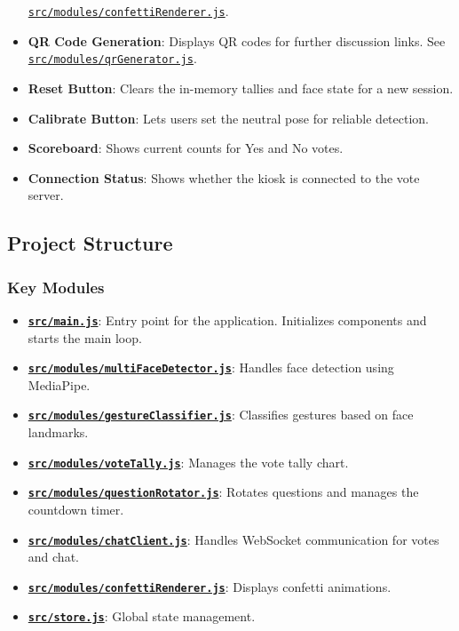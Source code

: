 \begin{itemize}
  \href{src/modules/confettiRenderer.js}{\texttt{src/modules/confettiRenderer.js}}.
\item
  \textbf{QR Code Generation}: Displays QR codes for further discussion
  links. See
  \href{src/modules/qrGenerator.js}{\texttt{src/modules/qrGenerator.js}}.
\item
  \textbf{Reset Button}: Clears the in-memory tallies and face state for
  a new session.
\item
  \textbf{Calibrate Button}: Lets users set the neutral pose for
  reliable detection.
\item
  \textbf{Scoreboard}: Shows current counts for Yes and No votes.
\item
  \textbf{Connection Status}: Shows whether the kiosk is connected to
  the vote server.
\end{itemize}

\subsection{Project Structure}\label{project-structure}

\subsubsection{Key Modules}\label{key-modules}

\begin{itemize}
\tightlist
\item
  \textbf{\href{src/main.js}{\texttt{src/main.js}}}: Entry point for the
  application. Initializes components and starts the main loop.
\item
  \textbf{\href{src/modules/multiFaceDetector.js}{\texttt{src/modules/multiFaceDetector.js}}}:
  Handles face detection using MediaPipe.
\item
  \textbf{\href{src/modules/gestureClassifier.js}{\texttt{src/modules/gestureClassifier.js}}}:
  Classifies gestures based on face landmarks.
\item
  \textbf{\href{src/modules/voteTally.js}{\texttt{src/modules/voteTally.js}}}:
  Manages the vote tally chart.
\item
  \textbf{\href{src/modules/questionRotator.js}{\texttt{src/modules/questionRotator.js}}}:
  Rotates questions and manages the countdown timer.
\item
  \textbf{\href{src/modules/chatClient.js}{\texttt{src/modules/chatClient.js}}}:
  Handles WebSocket communication for votes and chat.
\item
  \textbf{\href{src/modules/confettiRenderer.js}{\texttt{src/modules/confettiRenderer.js}}}:
  Displays confetti animations.
\item
  \textbf{\href{src/store.js}{\texttt{src/store.js}}}: Global state
  management.
\end{itemize}

